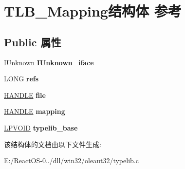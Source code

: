 \hypertarget{struct_t_l_b___mapping}{}\section{T\+L\+B\+\_\+\+Mapping结构体 参考}
\label{struct_t_l_b___mapping}
\subsection*{Public 属性}
\begin{DoxyCompactItemize}
\item 
\mbox{\label{struct_t_l_b___mapping_af2b65e41c1c795a8b4d5d3104015c118}} 
\hyperlink{interface_i_unknown}{I\+Unknown} {\bfseries I\+Unknown\+\_\+iface}
\item 
\mbox{\label{struct_t_l_b___mapping_a2d56924fe8fe001b41817506df0ba36e}} 
L\+O\+NG {\bfseries refs}
\item 
\mbox{\label{struct_t_l_b___mapping_a57f7351d38ae71830aec07c64a722a37}} 
\hyperlink{interfacevoid}{H\+A\+N\+D\+LE} {\bfseries file}
\item 
\mbox{\label{struct_t_l_b___mapping_ab6bf61472a91d138ea1cee56f5806216}} 
\hyperlink{interfacevoid}{H\+A\+N\+D\+LE} {\bfseries mapping}
\item 
\mbox{\label{struct_t_l_b___mapping_a83b30eae4515ff0bd0d0df63e46ef2e5}} 
\hyperlink{interfacevoid}{L\+P\+V\+O\+ID} {\bfseries typelib\+\_\+base}
\end{DoxyCompactItemize}


该结构体的文档由以下文件生成\+:\begin{DoxyCompactItemize}
\item 
E\+:/\+React\+O\+S-\/0../dll/win32/oleaut32/typelib.\+c\end{DoxyCompactItemize}
